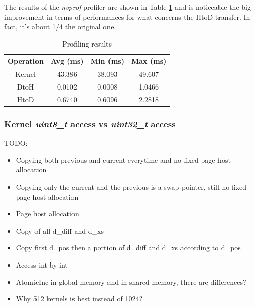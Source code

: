 \documentclass[paper=a4, fontsize=10pt]{scrartcl}	%
\begin{document}
	The results of the \textit{nvprof} profiler are shown in Table \ref{tab:nvprof_naif3} and is noticeable the big improvement in terms of performances for what concerns the HtoD transfer. In fact, it's about 1/4 the original one.

	\begin{table}[H]
		\centering
		\begin{tabular}{||c | c c c||} 
			\hline
			Operation & Avg (ms) & Min (ms) & Max (ms) \\ [0.5ex] 
			\hline\hline
			Kernel & 43.386 & 38.093 & 49.607 \\ 
			\hdashline
			DtoH & 0.0102 & 0.0008 & 1.0466 \\
			\hdashline
			HtoD & 0.6740 & 0.6096 & 2.2818 \\
			\hline
		\end{tabular}
		\caption{Profiling results}
		\label{tab:nvprof_naif3}
	\end{table}

	\subsubsection{Kernel \textit{uint8\_t} access vs \textit{uint32\_t} access}


	TODO:
	\begin{itemize}
		\item Copying both previous and current everytime and no fixed page host allocation
		\item Copying only the current and the previous is a swap pointer, still no fixed page host allocation
		\item Page host allocation
		\item Copy of all d\_diff and d\_xs
		\item Copy first d\_pos then a portion of d\_diff and d\_xs according to d\_pos
		\item Access int-by-int
		\item AtomicInc in global memory and in shared memory, there are differences?
		\item Why 512 kernels is best instead of 1024?
	\end{itemize}
\end{document}
